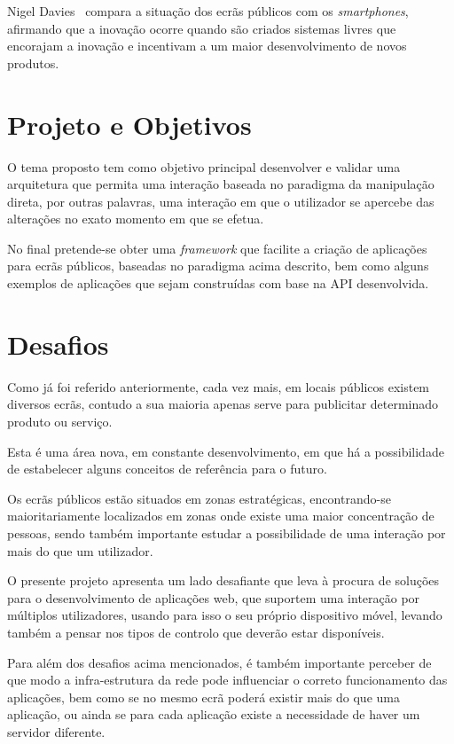 Nigel Davies~\cite{Davies2012b} compara a situação dos ecrãs públicos com os \textit{smartphones}, afirmando que a inovação ocorre quando são criados sistemas livres que encorajam a inovação e incentivam a um maior desenvolvimento de novos produtos.

\section{Projeto e Objetivos} \label{sec:proj}

O tema proposto tem como objetivo principal desenvolver e validar uma arquitetura que permita uma interação baseada no paradigma da manipulação direta, por outras palavras, uma interação em que o utilizador se apercebe das alterações no exato momento em que se efetua.

No final pretende-se obter uma \textit{framework} que facilite a criação de aplicações para ecrãs públicos, baseadas no paradigma acima descrito, bem como alguns exemplos de aplicações que sejam construídas com base na API desenvolvida.

\section{Desafios} \label{sec:goals}

Como já foi referido anteriormente, cada vez mais, em locais públicos existem diversos ecrãs, contudo a sua maioria apenas serve para publicitar determinado produto ou serviço. 

Esta é uma área nova, em constante desenvolvimento, em que há a possibilidade de estabelecer alguns conceitos de referência para o futuro.

Os ecrãs públicos estão situados em zonas estratégicas, encontrando-se maioritariamente localizados em zonas onde existe uma maior concentração de pessoas, sendo também importante estudar a possibilidade de uma interação por mais do que um utilizador.

O presente projeto apresenta um lado desafiante que leva à procura de soluções para o desenvolvimento de aplicações web, que suportem uma interação por múltiplos utilizadores, usando para isso o seu próprio dispositivo móvel, levando também a pensar nos tipos de controlo que deverão estar disponíveis. 

Para além dos desafios acima mencionados, é também importante perceber de que modo a infra-estrutura da rede pode influenciar o correto funcionamento das aplicações, bem como se no mesmo ecrã poderá existir mais do que uma aplicação, ou ainda se para cada aplicação existe a necessidade de haver um servidor diferente. 

